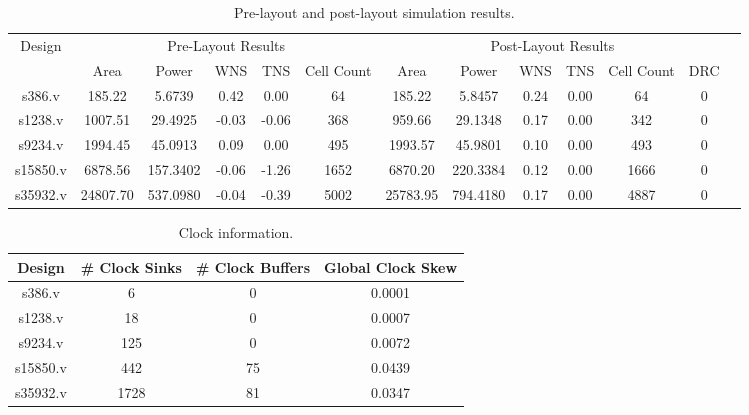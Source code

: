 \documentclass{article}
\begin{document}
\begin{table}[h]
\centering
\caption{Pre-layout and post-layout simulation results.}
\begin{tabular}{ |c|c|c|c|c|c|c|c|c|c|c|c|c| }
    \hline
    \multirow{2}{*}{Design} & \multicolumn{5}{|c|}{Pre-Layout Results} & \multicolumn{6}{|c|}{Post-Layout Results} \\
    \cline{2-12}
    & Area & Power & WNS & TNS & Cell Count & Area & Power & WNS & TNS & Cell Count & DRC \\
    \hline
    s386.v & 185.22 & 5.6739 & 0.42 & 0.00 & 64 & 185.22 & 5.8457 & 0.24 & 0.00 & 64 & 0 \\
    \hline
    s1238.v & 1007.51 & 29.4925 & -0.03 & -0.06 & 368 & 959.66 & 29.1348 & 0.17 & 0.00 & 342 & 0 \\
    \hline
    s9234.v & 1994.45 & 45.0913 & 0.09 & 0.00 & 495 & 1993.57 & 45.9801 & 0.10 & 0.00 & 493 & 0 \\
    \hline
    s15850.v & 6878.56 & 157.3402 & -0.06 & -1.26 & 1652 & 6870.20 & 220.3384 & 0.12 & 0.00 & 1666 & 0 \\
    \hline
    s35932.v & 24807.70 & 537.0980 & -0.04 & -0.39 & 5002 & 25783.95 & 794.4180 & 0.17 & 0.00 & 4887 & 0 \\
    \hline
\end{tabular}
\end{table}

\begin{table}[h]
\centering
\caption{Clock information.}
\begin{tabular}{ |c|c|c|c| }
    \hline
    Design & \# Clock Sinks & \# Clock Buffers & Global Clock Skew \\
    \hline
    s386.v & 6 & 0 & 0.0001 \\
    \hline
    s1238.v & 18 & 0 & 0.0007 \\
    \hline
    s9234.v & 125 & 0 & 0.0072 \\
    \hline
    s15850.v & 442 & 75 & 0.0439 \\
    \hline
    s35932.v & 1728 & 81 & 0.0347 \\
    \hline
\end{tabular}
\end{table}
\end{document}
